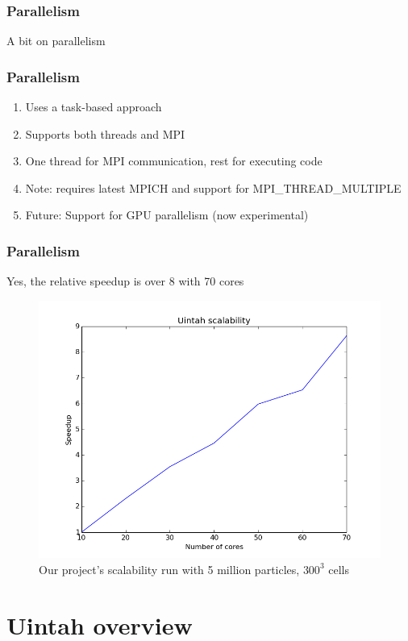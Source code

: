 \documentclass{beamer}
\begin{document}
\begin{frame}
 \frametitle{Parallelism}
 A bit on parallelism
\end{frame}


\begin{frame}
 \frametitle{Parallelism}
 \begin{enumerate}
  \item Uses a task-based approach
  \item Supports both threads and MPI
  \item One thread for MPI communication, rest for executing code
  \item Note: requires latest MPICH and support for MPI\_THREAD\_MULTIPLE
  \item Future: Support for GPU parallelism (now experimental)
 \end{enumerate}
\end{frame}


\begin{frame}
 \frametitle{Parallelism}
 \footnotesize{Yes, the relative speedup is over 8 with 70 cores}
 \begin{figure}
  \centering
  \includegraphics[height=0.7\textheight]{scalability2.png}
  \caption{\tiny{Our project's scalability run with 5 million particles, $300^3$ cells}}
 \end{figure}
\end{frame}


\section{Uintah overview}
\end{document}
